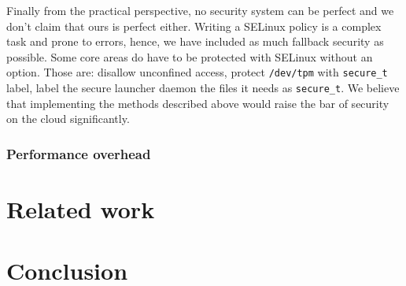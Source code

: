 \documentclass[10pt,twocolumn,pdftex]{article}
\begin{document}
Finally from the practical perspective, no security system can be perfect and we don't claim that ours is perfect either. Writing a SELinux policy is a complex task and prone to errors, hence, we have included as much fallback security as possible. Some core areas do have to be protected with SELinux without an option. Those are: disallow unconfined access, protect {\tt /dev/tpm} with {\tt secure\_t} label, label the secure launcher daemon the files it needs as {\tt secure\_t}. We believe that implementing the methods described above would raise the bar of security on the cloud significantly.

\subsubsection{Performance overhead}

\section{Related work}
\label{sec:related}

\section{Conclusion}
\label{sec:conclusion}

{}

\end{document}
